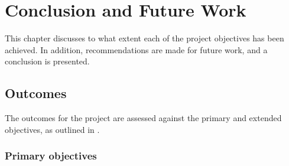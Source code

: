 \documentclass[main.tex]{subfiles}
\begin{document}
\chapter{Conclusion and Future Work}
This chapter discusses to what extent each of the project objectives has been achieved. In addition, recommendations are made for future work, and a conclusion is presented.  


\section{Outcomes}
The outcomes for the project are assessed against the primary and extended objectives, as outlined in .

\subsection{Primary objectives}
\end{document}
